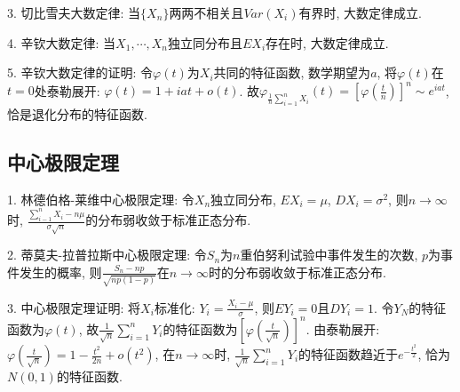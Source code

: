 3. 切比雪夫大数定律: 当$\{X_n\}$两两不相关且$Var(X_i)$有界时, 大数定律成立.

4. 辛钦大数定律: 当$X_1,\cdots,X_n$独立同分布且$EX_i$存在时, 大数定律成立.

5. 辛钦大数定律的证明: 令$\varphi(t)$为$X_i$共同的特征函数, 数学期望为$a$, 将$\varphi(t)$在$t=0$处泰勒展开: $\varphi(t)=1+iat+o(t)$. 
故$\varphi_{\frac{1}{n}\sum\limits_{i=1}^n X_i}(t)=\left[\varphi\left(\frac{t}{n}\right)\right]^n \sim e^{iat}$, 恰是退化分布的特征函数.

\subsection{中心极限定理}

1. 林德伯格-莱维中心极限定理: 令$X_n$独立同分布, $EX_i=\mu$, $DX_i=\sigma^2$, 则$n\rightarrow \infty$时, $\frac{\sum\limits_{i-1}^n X_i-n\mu}{\sigma\sqrt{n}}$的分布弱收敛于标准正态分布.

2. 蒂莫夫-拉普拉斯中心极限定理: 令$S_n$为$n$重伯努利试验中事件发生的次数, $p$为事件发生的概率, 则$\frac{S_n-np}{\sqrt{np(1-p)}}$在$n\rightarrow \infty$时的分布弱收敛于标准正态分布.

3. 中心极限定理证明: 将$X_i$标准化: $Y_i=\frac{X_i-\mu}{\sigma}$, 则$EY_i=0$且$DY_i=1$. 令$Y_N$的特征函数为$\varphi(t)$, 故$\frac{1}{\sqrt{n}}\sum\limits_{i=1}^n Y_i$的特征函数为$\left[\varphi\left(\frac{t}{\sqrt{n}}\right)\right]^n$.
由泰勒展开: $\varphi\left(\frac{t}{\sqrt{n}}\right)=1-\frac{t^2}{2n}+o(t^2)$, 在$n\rightarrow \infty $时, $\frac{1}{\sqrt{n}}\sum\limits_{i=1}^n Y_i$的特征函数趋近于$e^{-\frac{t^2}{2}}$, 恰为$N(0,1)$的特征函数.
